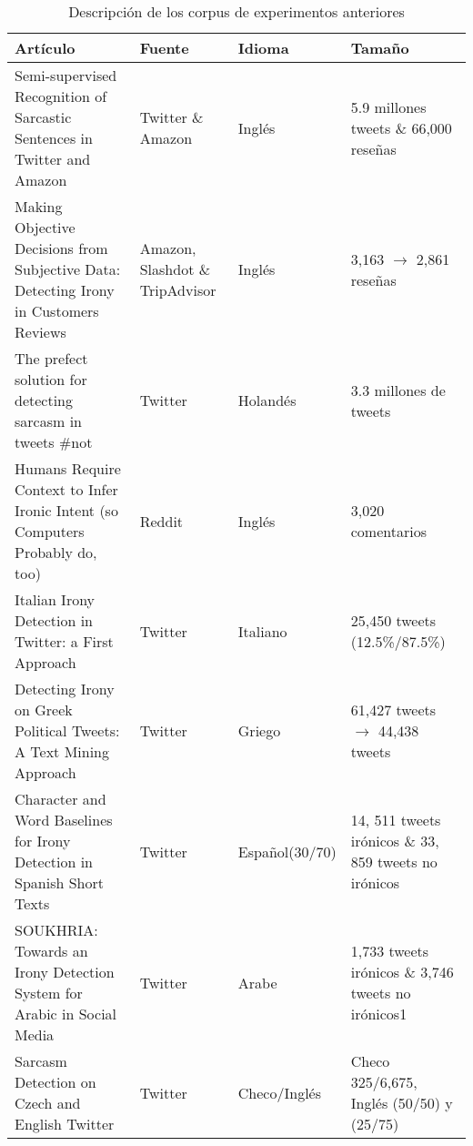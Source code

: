 \begin{table}[]
\begin{tabular}{|p{5cm}p{2cm}lp{3cm}|}
\hline
\multicolumn{1}{|l|}{Artículo}                                                        & \multicolumn{1}{l|}{Fuente} & \multicolumn{1}{l|}{Idioma} & Tamaño                                               \\ \hline
\hline
Semi-supervised Recognition of Sarcastic Sentences in Twitter and Amazon \cite{davidov2010semi}              & Twitter \& Amazon           & Inglés                      & 5.9 millones tweets \& 66,000 reseñas                \\ \hline
Making Objective Decisions from Subjective Data: Detecting Irony in Customers Reviews \cite{reyes2012making} & Amazon, Slashdot \& TripAdvisor            & Inglés                      & 3,163 $\rightarrow$ 2,861 reseñas                    \\ \hline
The prefect solution for detecting sarcasm in tweets \#not \cite{liebrecht2013perfect}                            & Twitter                     & Holandés                    & 3.3 millones de tweets                               \\ \hline
Humans Require Context to Infer Ironic Intent (so Computers Probably do, too) \cite{wallace2014humans}         & Reddit                      & Inglés                      & 3,020 comentarios                                    \\ \hline
Italian Irony Detection in Twitter: a First Approach \cite{barbieri2014italian}                                  & Twitter                     & Italiano                    & 25,450 tweets (12.5\%/87.5\%)                        \\ \hline
Detecting Irony on Greek Political Tweets: A Text Mining Approach \cite{charalampakis2015detecting}                     & Twitter                     & Griego                      & 61,427 tweets $\rightarrow$ 44,438 tweets            \\ \hline
Character and Word Baselines for Irony Detection in Spanish Short Texts \cite{lopez2016character}               & Twitter                     & Español(30/70)                     & 14, 511 tweets irónicos \& 33, 859 tweets no irónicos \\ \hline
SOUKHRIA: Towards an Irony Detection System for Arabic in Social Media \cite{karoui2017soukhria}                & Twitter                     & Arabe                       & 1,733 tweets irónicos \& 3,746 tweets no irónicos1   \\ \hline
Sarcasm Detection on Czech and English Twitter \cite{ptavcek2014sarcasm}                & Twitter                     & Checo/Inglés                       & Checo 325/6,675, Inglés (50/50) y (25/75) \\ \hline
\end{tabular}
\caption{Descripción de los corpus de experimentos anteriores}
\label{tab:corpuses}
\end{table}
